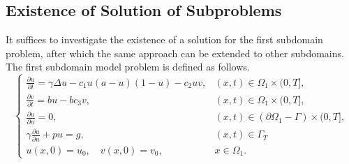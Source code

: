 \documentclass[11pt]{article}
\begin{document}
\subsection{Existence of Solution of Subproblems}
It suffices to investigate the existence of a solution for the first subdomain problem, after which the same approach can be extended to other subdomains. The first subdomain model problem is defined as follows.
\begin{equation}\label{RM_subproblem}
\begin{cases}
\frac{\partial u}{\partial t}  = \gamma \Delta u - c_1u(a-u)(1-u) - c_2uv, & (x,t)\in\Omega_1\times(0,T],\\
\frac{\partial v}{\partial t} = bu - bc_3v , & (x,t)\in\Omega_1\times(0,T],\\
\frac{\partial u}{\partial n}=0, & (x,t)\in\left(\partial\Omega_1 - \Gamma\right)\times(0,T],\\
\gamma\frac{\partial u}{\partial n} + pu
 = g,  & (x,t)\in\Gamma_T\\
u(x,0)=u_0,  \quad v(x,0)=v_0, & x\in \Omega_1.
\end{cases}
\end{equation}
\end{document}

